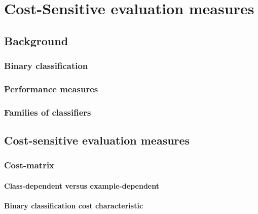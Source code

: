\documentclass[twoside,openright,titlepage,numbers=noenddot,headinclude,%
               footinclude=true,cleardoublepage=empty,abstractoff,BCOR=5mm,%
               paper=a4,fontsize=11pt,ngerman,american]{scrreprt}
\numberwithin{theorem}{chapter}
\numberwithin{definition}{chapter}
\numberwithin{algorithm}{chapter}
\numberwithin{figure}{chapter}
\numberwithin{table}{chapter}
\numberwithin{equation}{chapter}
\begin{document}
\frenchspacing
\raggedbottom
{}
\pagestyle{plain}



\cleardoublepage
\cleardoublepage
\cleardoublepage
\cleardoublepage
\cleardoublepage
\pagestyle{scrheadings}
\cleardoublepage



\cleardoublepage
\cleardoublepage

\part{Cost-Sensitive evaluation measures}
\chapter{Background}
	\section{Binary classification}
	\section{Performance measures}
	\section{Families of classifiers}

\chapter{Cost-sensitive evaluation measures}                                              
	\section{Cost-matrix}
		\subsection{Class-dependent versus example-dependent}
		\subsection{Binary classification cost characteristic}
\end{document}
